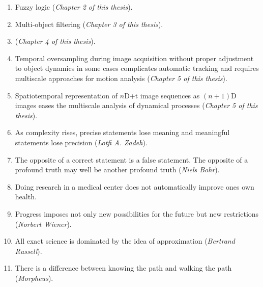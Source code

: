 \documentclass[10pt, twoside]{report}
\begin{document}
\begin{enumerate}
  
\item Fuzzy logic (\emph{Chapter 2 of this thesis}). 
  
\medskip
  
\item Multi-object filtering (\emph{Chapter
    3 of this thesis}).  
  
\medskip
\item  (\emph{Chapter 4 of this thesis}). 

\medskip
\item Temporal oversampling during image acquisition without
  proper adjustment to object dynamics in some cases complicates
  automatic tracking and requires multiscale approaches for motion
  analysis (\emph{Chapter 5 of this thesis}). 

\medskip
\item Spatiotemporal representation of $n$D+t image sequences as
  $(n+1)$D images eases the multiscale analysis of dynamical processes
  (\emph{Chapter 5 of this thesis}). 


\medskip
  
\item As complexity rises, precise statements lose meaning and meaningful statements lose precision (\emph{Lotfi A. Zadeh}). 

\medskip
  
\item The opposite of a correct statement is a false statement. The
  opposite of a profound truth may well be another profound truth
  (\emph{Niels Bohr}). 

\medskip

\item Doing research in a medical center does not automatically
  improve ones own health.

\medskip

\item Progress imposes not only new possibilities for the future but
  new restrictions (\emph{Norbert Wiener}).

\medskip

\item All exact science is dominated by the idea of approximation (\emph{Bertrand Russell}).
\medskip

\item There is a difference between knowing the path and walking the
  path (\emph{Morpheus}).



\end{enumerate}

\end{document}
